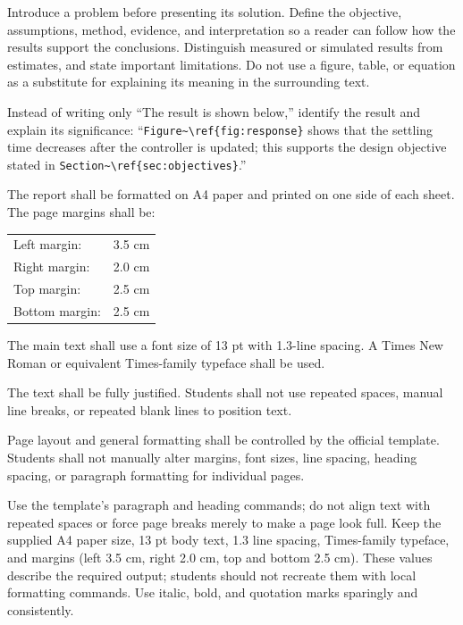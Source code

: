 {Introduce a problem before presenting its solution. Define the
objective, assumptions, method, evidence, and interpretation so a
reader can follow how the results support the conclusions. Distinguish
measured or simulated results from estimates, and state important
limitations. Do not use a figure, table, or equation as a substitute
for explaining its meaning in the surrounding text.

\RegExample Instead of writing only ``The result is shown below,''
identify the result and explain its significance: ``\verb|Figure~\ref{fig:response}|
shows that the settling time decreases after the controller is
updated; this supports the design objective stated in
\verb|Section~\ref{sec:objectives}|.''

\vspace{0.3cm}



The report shall be formatted on A4 paper and printed on one side
of each sheet. The page margins shall be:

\begin{center}
\begin{tabular}{ll}
    Left margin:   & 3.5 cm \\
    Right margin:  & 2.0 cm \\
    Top margin:    & 2.5 cm \\
    Bottom margin: & 2.5 cm
\end{tabular}
\end{center}

The main text shall use a font size of 13 pt with 1.3-line spacing.
A Times New Roman or equivalent Times-family typeface shall be used.

The text shall be fully justified. Students shall not use repeated
spaces, manual line breaks, or repeated blank lines to position
text.

Page layout and general formatting shall be controlled by the
official template. Students shall not manually alter margins, font
sizes, line spacing, heading spacing, or paragraph formatting for
individual pages.


Use the template's paragraph and heading commands; do not align text
with repeated spaces or force page breaks merely to make a page look
full. Keep the supplied A4 paper size, 13 pt body text, 1.3 line
spacing, Times-family typeface, and margins (left 3.5 cm, right 2.0 cm,
top and bottom 2.5 cm). These values describe the required output;
students should not recreate them with local formatting commands.
Use italic, bold, and quotation marks sparingly and consistently.

}
